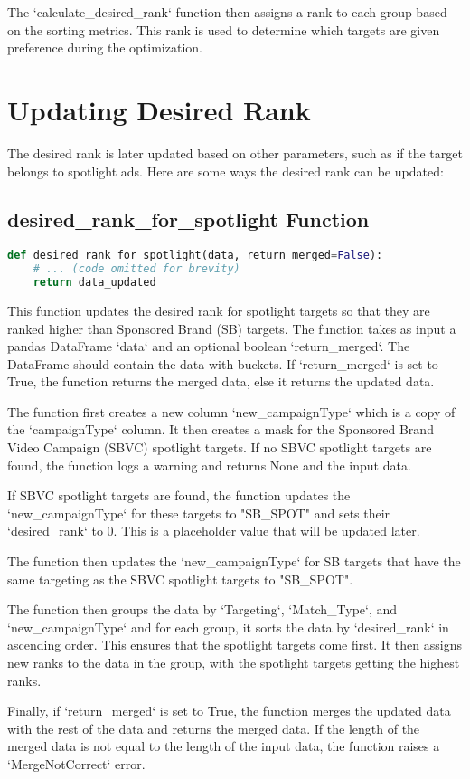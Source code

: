 The `calculate\_desired\_rank` function then assigns a rank to each group based on the sorting metrics. This rank is used to determine which targets are given preference during the optimization.

\section{Updating Desired Rank}

The desired rank is later updated based on other parameters, such as if the target belongs to spotlight ads. Here are some ways the desired rank can be updated:


\subsection{desired\_rank\_for\_spotlight Function}

\begin{lstlisting}[language=Python]
def desired_rank_for_spotlight(data, return_merged=False):
    # ... (code omitted for brevity)
    return data_updated
\end{lstlisting}

This function updates the desired rank for spotlight targets so that they are ranked higher than Sponsored Brand (SB) targets. The function takes as input a pandas DataFrame `data` and an optional boolean `return\_merged`. The DataFrame should contain the data with buckets. If `return\_merged` is set to True, the function returns the merged data, else it returns the updated data.

The function first creates a new column `new\_campaignType` which is a copy of the `campaignType` column. It then creates a mask for the Sponsored Brand Video Campaign (SBVC) spotlight targets. If no SBVC spotlight targets are found, the function logs a warning and returns None and the input data.

If SBVC spotlight targets are found, the function updates the `new\_campaignType` for these targets to "SB\_SPOT" and sets their `desired\_rank` to 0. This is a placeholder value that will be updated later.

The function then updates the `new\_campaignType` for SB targets that have the same targeting as the SBVC spotlight targets to "SB\_SPOT".

The function then groups the data by `Targeting`, `Match\_Type`, and `new\_campaignType` and for each group, it sorts the data by `desired\_rank` in ascending order. This ensures that the spotlight targets come first. It then assigns new ranks to the data in the group, with the spotlight targets getting the highest ranks.

Finally, if `return\_merged` is set to True, the function merges the updated data with the rest of the data and returns the merged data. If the length of the merged data is not equal to the length of the input data, the function raises a `MergeNotCorrect` error.